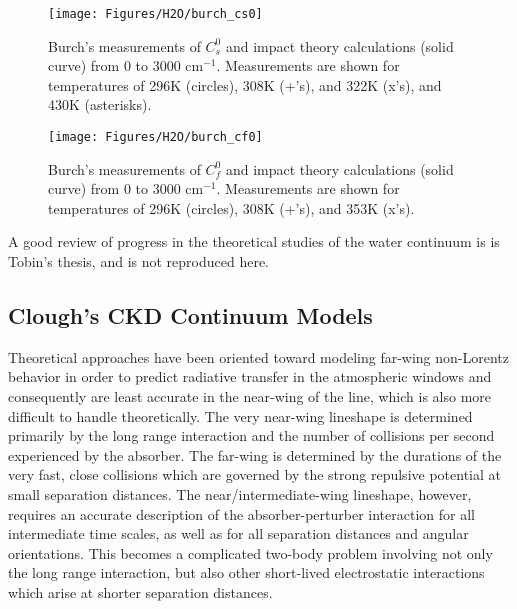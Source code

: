 \documentclass[11pt]{article}
\begin{document}
\begin{figure}
\begin{center}
\texttt{[image: Figures/H2O/burch\_cs0]}\end{center}
\caption[Burch's measurements of $C_s^0$, the self-broadened continuum
coefficients, and impact theory calculations
from 0 to 3000 cm$^{-1}$.]{Burch's measurements of $C_s^0$ and impact
theory calculations (solid curve) from 0 to 3000 cm$^{-1}$.
Measurements are shown for temperatures of 296K (circles), 308K (+'s), and 
322K (x's), and 430K (asterisks).}
\label{fig:burch_data1}
\end{figure}

\begin{figure}
\begin{center}
\texttt{[image: Figures/H2O/burch\_cf0]}
\end{center}
\caption[Burch's measurements of $C_f^0$, the nitrogen broadened continuum
coefficients, and impact theory calculations from 0 to 3000 cm$^{-1}$.] 
{Burch's measurements of $C_f^0$ and impact theory calculations 
(solid curve) from 0 to 3000 cm$^{-1}$.  Measurements are shown for 
temperatures of 296K (circles), 308K (+'s), and 353K (x's).}
\label{fig:burch_data2}
\end{figure}

A good review of progress in the theoretical studies of the water
continuum is is Tobin's thesis, and is not reproduced here. 

\subsection{Clough's CKD Continuum Models}\label{sec:ckd}

Theoretical approaches have been oriented toward modeling 
far-wing non-Lorentz behavior in order to predict radiative transfer in the
atmospheric windows and consequently are least accurate in the
near-wing of the line, which is also more difficult to handle theoretically.
The very near-wing lineshape is determined primarily by the long
range interaction and the number of collisions per second experienced by
the absorber.  The far-wing is determined by the durations of the very
fast, close collisions which are governed by the strong repulsive
potential at small separation distances.  The
near/intermediate-wing lineshape, however, requires an accurate description
of the absorber-perturber interaction for all intermediate time scales, as
well as for all separation distances and angular orientations.  This
becomes a complicated two-body problem involving not only the long range
interaction, but also other short-lived electrostatic interactions which 
arise at shorter separation distances.
\end{document}
